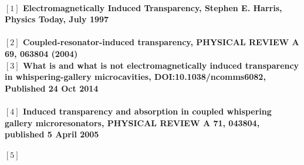\paragraph{\normalfont \large $[1]$ Electromagnetically Induced Transparency, Stephen E. Harris, Physics Today, July 1997 \\ 
\\$[2]$ Coupled-resonator-induced transparency, PHYSICAL REVIEW A 69, 063804 (2004)
\\$[3]$ What is and what is not electromagnetically induced transparency in whispering-gallery microcavities, DOI:10.1038/ncomms6082, Published 24 Oct 2014 \\
\\$[4]$  Induced transparency and absorption in coupled whispering gallery microresonators, PHYSICAL REVIEW A 71, 043804, published 5 April 2005\\
\\$[5]$  }